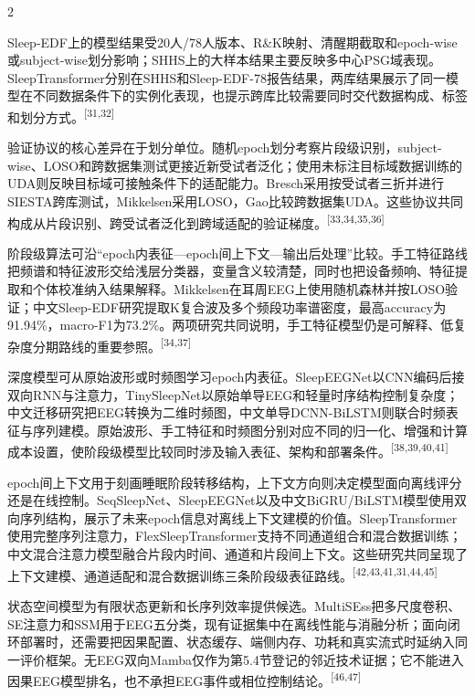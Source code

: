 \documentclass[UTF8,zihao=5,fontset=none]{ctexart}
\newcommand{\hei}{\CJKfamily{hei}}
\newcommand{\levelthree}[1]{%
  \par\vspace{2pt}\noindent{\hei\fontsize{10pt}{16pt}\selectfont\bfseries #1}}
\newcommand{\refcite}[1]{\nolinebreak[4]\textsuperscript{[#1]}}
\begin{document}
\begin{multicols}{2}

Sleep-EDF上的模型结果受20人/78人版本、R\&K映射、清醒期截取和epoch-wise或subject-wise划分影响；SHHS上的大样本结果主要反映多中心PSG域表现。SleepTransformer分别在SHHS和Sleep-EDF-78报告结果，两库结果展示了同一模型在不同数据条件下的实例化表现，也提示跨库比较需要同时交代数据构成、标签和划分方式。\refcite{31,32}\par

验证协议的核心差异在于划分单位。随机epoch划分考察片段级识别，subject-wise、LOSO和跨数据集测试更接近新受试者泛化；使用未标注目标域数据训练的UDA则反映目标域可接触条件下的适配能力。Bresch采用按受试者三折并进行SIESTA跨库测试，Mikkelsen采用LOSO，Gao比较跨数据集UDA。这些协议共同构成从片段识别、跨受试者泛化到跨域适配的验证梯度。\refcite{33,34,35,36}\par

\levelthree{2.2.3 阶段级表征与上下文模型}

阶段级算法可沿“epoch内表征—epoch间上下文—输出后处理”比较。手工特征路线把频谱和特征波形交给浅层分类器，变量含义较清楚，同时也把设备频响、特征提取和个体校准纳入结果解释。Mikkelsen在耳周EEG上使用随机森林并按LOSO验证；中文Sleep-EDF研究提取K复合波及多个频段功率谱密度，最高accuracy为91.94\%，macro-F1为73.2\%。两项研究共同说明，手工特征模型仍是可解释、低复杂度分期路线的重要参照。\refcite{34,37}\par

深度模型可从原始波形或时频图学习epoch内表征。SleepEEGNet以CNN编码后接双向RNN与注意力，TinySleepNet以原始单导EEG和轻量时序结构控制复杂度；中文迁移研究把EEG转换为二维时频图，中文单导DCNN-BiLSTM则联合时频表征与序列建模。原始波形、手工特征和时频图分别对应不同的归一化、增强和计算成本设置，使阶段级模型比较同时涉及输入表征、架构和部署条件。\refcite{38,39,40,41}\par

epoch间上下文用于刻画睡眠阶段转移结构，上下文方向则决定模型面向离线评分还是在线控制。SeqSleepNet、SleepEEGNet以及中文BiGRU/BiLSTM模型使用双向序列结构，展示了未来epoch信息对离线上下文建模的价值。SleepTransformer使用完整序列注意力，FlexSleepTransformer支持不同通道组合和混合数据训练；中文混合注意力模型融合片段内时间、通道和片段间上下文。这些研究共同呈现了上下文建模、通道适配和混合数据训练三条阶段级表征路线。\refcite{42,43,41,31,44,45}\par

状态空间模型为有限状态更新和长序列效率提供候选。MultiSEss把多尺度卷积、SE注意力和SSM用于EEG五分类，现有证据集中在离线性能与消融分析；面向闭环部署时，还需要把因果配置、状态缓存、端侧内存、功耗和真实流式时延纳入同一评价框架。无EEG双向Mamba仅作为第5.4节登记的邻近技术证据；它不能进入因果EEG模型排名，也不承担EEG事件或相位控制结论。\refcite{46,47}\par


\end{multicols}
\end{document}
